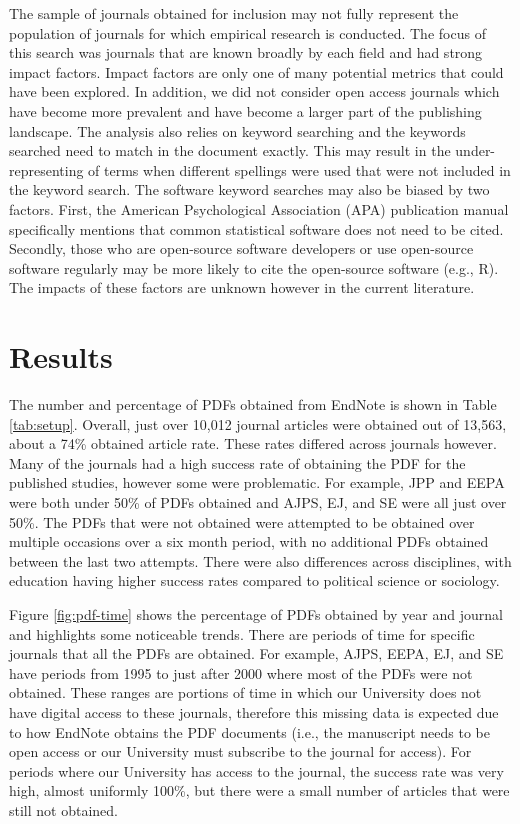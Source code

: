 \documentclass[
  english,
  ,man]{apa7}
\begin{document}
The sample of journals obtained for inclusion may not fully represent the population of journals for which empirical research is conducted. The focus of this search was journals that are known broadly by each field and had strong impact factors. Impact factors are only one of many potential metrics that could have been explored. In addition, we did not consider open access journals which have become more prevalent and have become a larger part of the publishing landscape. The analysis also relies on keyword searching and the keywords searched need to match in the document exactly. This may result in the under-representing of terms when different spellings were used that were not included in the keyword search. The software keyword searches may also be biased by two factors. First, the American Psychological Association (APA) publication manual specifically mentions that common statistical software does not need to be cited. Secondly, those who are open-source software developers or use open-source software regularly may be more likely to cite the open-source software (e.g., R). The impacts of these factors are unknown however in the current literature.

\hypertarget{results}{%
\section{Results}\label{results}}

The number and percentage of PDFs obtained from EndNote is shown in Table \ref{tab:setup}. Overall, just over 10,012 journal articles were obtained out of 13,563, about a 74\% obtained article rate. These rates differed across journals however. Many of the journals had a high success rate of obtaining the PDF for the published studies, however some were problematic. For example, JPP and EEPA were both under 50\% of PDFs obtained and AJPS, EJ, and SE were all just over 50\%. The PDFs that were not obtained were attempted to be obtained over multiple occasions over a six month period, with no additional PDFs obtained between the last two attempts. There were also differences across disciplines, with education having higher success rates compared to political science or sociology.

Figure \ref{fig:pdf-time} shows the percentage of PDFs obtained by year and journal and highlights some noticeable trends. There are periods of time for specific journals that all the PDFs are obtained. For example, AJPS, EEPA, EJ, and SE have periods from 1995 to just after 2000 where most of the PDFs were not obtained. These ranges are portions of time in which our University does not have digital access to these journals, therefore this missing data is expected due to how EndNote obtains the PDF documents (i.e., the manuscript needs to be open access or our University must subscribe to the journal for access). For periods where our University has access to the journal, the success rate was very high, almost uniformly 100\%, but there were a small number of articles that were still not obtained.
\end{document}
